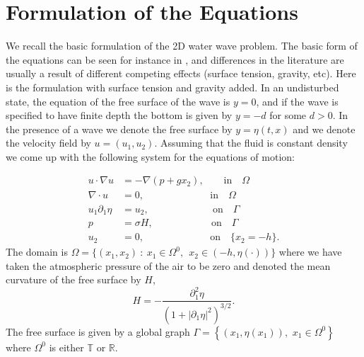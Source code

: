 \section{Formulation of the Equations}

We recall the basic formulation of the 2D water wave problem. The basic form of the equations can be seen for instance in \cite{CS04}, and differences in the literature are usually a result of different competing effects (surface tension, gravity, etc). Here is the formulation with surface tension and gravity added. In an undisturbed state, the equation of the free surface of the wave is $y = 0$, and if the wave is specified to have finite depth the bottom is given by $y = -d$ for some $d > 0$. In the presence of a wave we denote the free surface by $y = \eta(t, x)$ and we denote the velocity field by $u = (u_1, u_2)$. Assuming that the fluid is constant density we come up with the following system for the equations of motion:

\begin{align}\label{eeb}
u\cdot \nabla u &= -\nabla (p +g x_2),\qquad \text{in} \quad \Omega\\
\nabla \cdot u &= 0,\qquad\qquad\quad\quad \   \ \ \text{in} \quad \Omega\\ \label{eefree}
u_1 \partial_1\eta& = u_2, \qquad\qquad\quad\quad \  \    \text{on} \quad \Gamma \\ 
p& = \sigma H,\qquad\qquad\quad\ \ \  \   \text{on} \quad \Gamma\\
u_2& = 0, \qquad\qquad\quad\quad \   \ \ \text{on} \quad \{x_2=-h\}.\label{eef}
\end{align}
The domain is $\Omega=\{(x_1,x_2) \ : \ x_1\in \Omega^0, \ \ x_2\in (-h,\eta(\cdot))\}$ where we have taken the atmospheric pressure of the air to be zero and denoted the mean curvature of the free surface by $H$,
\[
H= -\frac{\partial_1^2 \eta}{ (1+|\partial_1 \eta|^2)^{3/2}}.
\]
The free surface is given by a global graph $\Gamma=\left \{ (x_1,\eta(x_1)),\,\,x_1\in \Omega^0 \right \}$ where $\Omega^0$ is either $\mathbb T$ or $\mathbb R$.